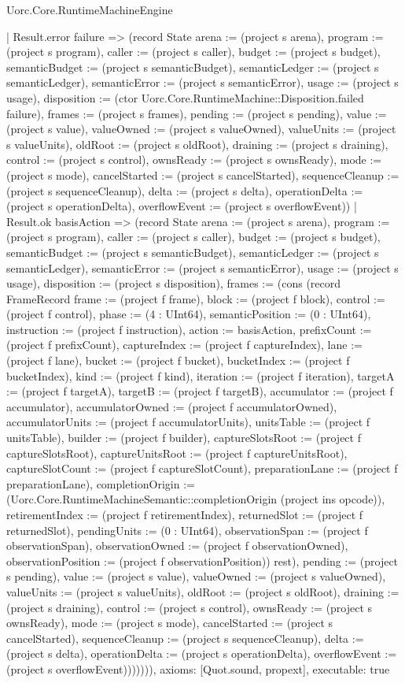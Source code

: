 \begin{lexlean}{Uorc.Core.RuntimeMachineEngine}
\begin{semanticmodule}
{        | Result.error failure => (record State {arena := (project s arena), program := (project s program), caller := (project s caller), budget := (project s budget), semanticBudget := (project s semanticBudget), semanticLedger := (project s semanticLedger), semanticError := (project s semanticError), usage := (project s usage), disposition := (ctor Uorc.Core.RuntimeMachine::Disposition.failed failure), frames := (project s frames), pending := (project s pending), value := (project s value), valueOwned := (project s valueOwned), valueUnits := (project s valueUnits), oldRoot := (project s oldRoot), draining := (project s draining), control := (project s control), ownsReady := (project s ownsReady), mode := (project s mode), cancelStarted := (project s cancelStarted), sequenceCleanup := (project s sequenceCleanup), delta := (project s delta), operationDelta := (project s operationDelta), overflowEvent := (project s overflowEvent)})
        | Result.ok basisAction => (record State {arena := (project s arena), program := (project s program), caller := (project s caller), budget := (project s budget), semanticBudget := (project s semanticBudget), semanticLedger := (project s semanticLedger), semanticError := (project s semanticError), usage := (project s usage), disposition := (project s disposition), frames := (cons (record FrameRecord {frame := (project f frame), block := (project f block), control := (project f control), phase := (4 : UInt64), semanticPosition := (0 : UInt64), instruction := (project f instruction), action := basisAction, prefixCount := (project f prefixCount), captureIndex := (project f captureIndex), lane := (project f lane), bucket := (project f bucket), bucketIndex := (project f bucketIndex), kind := (project f kind), iteration := (project f iteration), targetA := (project f targetA), targetB := (project f targetB), accumulator := (project f accumulator), accumulatorOwned := (project f accumulatorOwned), accumulatorUnits := (project f accumulatorUnits), unitsTable := (project f unitsTable), builder := (project f builder), captureSlotsRoot := (project f captureSlotsRoot), captureUnitsRoot := (project f captureUnitsRoot), captureSlotCount := (project f captureSlotCount), preparationLane := (project f preparationLane), completionOrigin := (Uorc.Core.RuntimeMachineSemantic::completionOrigin (project ins opcode)), retirementIndex := (project f retirementIndex), returnedSlot := (project f returnedSlot), pendingUnits := (0 : UInt64), observationSpan := (project f observationSpan), observationOwned := (project f observationOwned), observationPosition := (project f observationPosition)}) rest), pending := (project s pending), value := (project s value), valueOwned := (project s valueOwned), valueUnits := (project s valueUnits), oldRoot := (project s oldRoot), draining := (project s draining), control := (project s control), ownsReady := (project s ownsReady), mode := (project s mode), cancelStarted := (project s cancelStarted), sequenceCleanup := (project s sequenceCleanup), delta := (project s delta), operationDelta := (project s operationDelta), overflowEvent := (project s overflowEvent)})))))),
  axioms: [Quot.sound, propext],
  executable: true
}


\end{semanticmodule}
\end{lexlean}

